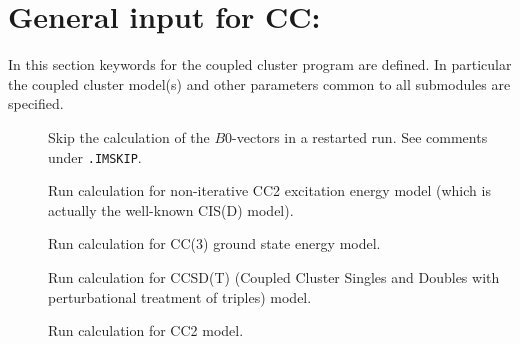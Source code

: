 \section{General input for CC: }\label{sec:ccgeneral}

In this section keywords for the coupled
cluster program are defined. In particular the coupled cluster 
model(s) and other parameters common to all submodules are specified.

\begin{description}
\item[] 
   Skip the calculation of the $B0$-vectors 
   in a restarted run. See comments under \verb|.IMSKIP|.
%
\item[]  
        Run calculation for non-iterative CC2 excitation energy model 
        (which is actually the well-known CIS(D) model).
 
\item[]  
       Run calculation for CC(3) ground state energy model.

\item[]  
        Run calculation for CCSD(T) (Coupled Cluster Singles and 
        Doubles with perturbational treatment of triples) model.
%
\item[]    
        Run calculation for CC2 model. 
 

\end{description}
